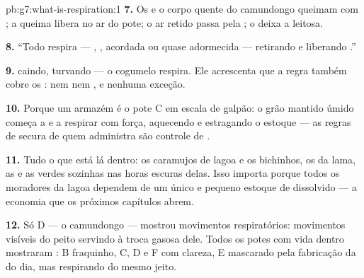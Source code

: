 \begin{solution}{pb:g7:what-is-respiration:1}
\textbf{7.} Os  e o corpo quente do camundongo queimam
 com ; a queima libera  no ar do pote;
o ar retido passa pela ; o  deixa a  leitosa.

\textbf{8.} ``Todo  respira --- , , 
acordada ou quase adormecida --- retirando  e liberando .''

\textbf{9.}  caindo,  turvando --- o cogumelo
respira. Ele acrescenta que a regra também cobre os : nem 
nem , e nenhuma exceção.

\textbf{10.} Porque um armazém é o pote C em escala de galpão: o grão
mantido úmido começa a  e a respirar com força, aquecendo e
estragando o estoque --- as regras de secura de quem administra são
controle de .

\textbf{11.} Tudo o que está lá dentro: os caramujos de lagoa e os
bichinhos, os  da lama, as  e as  verdes
sozinhas nas horas escuras delas. Isso importa porque todos os
moradores da lagoa dependem de um único e pequeno estoque de 
dissolvido --- a economia que os próximos capítulos abrem.

\textbf{12.} Só D --- o camundongo --- mostrou movimentos
respiratórios: movimentos visíveis do peito servindo à troca gasosa
dele. Todos os potes com vida dentro mostraram : B
fraquinho, C, D e F com clareza, E mascarado pela fabricação da  do
dia, mas respirando do mesmo jeito.
\end{solution}
